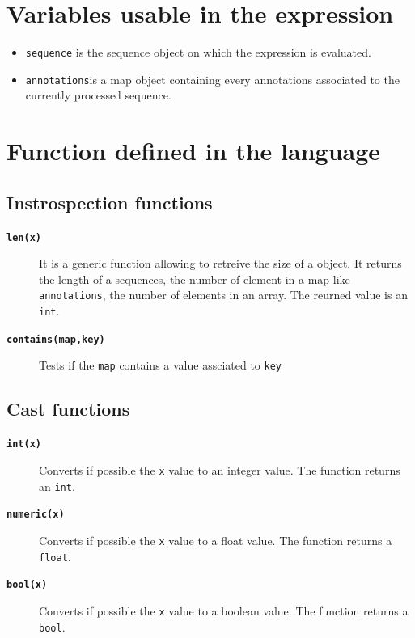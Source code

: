\documentclass[
  letterpaper,
  DIV=11,
  numbers=noendperiod]{scrreprt}
\providecommand{\tightlist}{%
  \setlength{\itemsep}{0pt}\setlength{\parskip}{0pt}}\usepackage{longtable,booktabs,array}
\begin{document}
\hypertarget{variables-usable-in-the-expression}{%
\section{Variables usable in the
expression}\label{variables-usable-in-the-expression}}

\begin{itemize}
\tightlist
\item
  \texttt{sequence} is the sequence object on which the expression is
  evaluated.
\item
  \texttt{annotations}is a map object containing every annotations
  associated to the currently processed sequence.
\end{itemize}

\hypertarget{function-defined-in-the-language}{%
\section{Function defined in the
language}\label{function-defined-in-the-language}}

\hypertarget{instrospection-functions}{%
\subsection*{Instrospection functions}\label{instrospection-functions}}

\begin{description}
\item[\textbf{\texttt{len(x)}}]
It is a generic function allowing to retreive the size of a object. It
returns the length of a sequences, the number of element in a map like
\texttt{annotations}, the number of elements in an array. The reurned
value is an \texttt{int}.
\item[\textbf{\texttt{contains(map,key)}}]
Tests if the \texttt{map} contains a value assciated to \texttt{key}
\end{description}

\hypertarget{cast-functions}{%
\subsection*{Cast functions}\label{cast-functions}}

\begin{description}
\item[\textbf{\texttt{int(x)}}]
Converts if possible the \texttt{x} value to an integer value. The
function returns an \texttt{int}.
\item[\textbf{\texttt{numeric(x)}}]
Converts if possible the \texttt{x} value to a float value. The function
returns a \texttt{float}.
\item[\textbf{\texttt{bool(x)}}]
Converts if possible the \texttt{x} value to a boolean value. The
function returns a \texttt{bool}.
\end{description}
\end{document}
